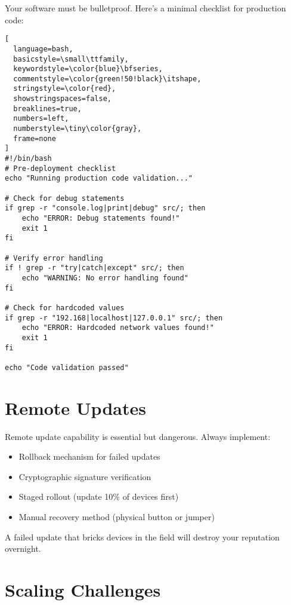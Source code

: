 Your software must be bulletproof. Here's a minimal checklist for production code:

\begin{tcolorbox}[colback=gray!5,colframe=gray!50,title=Production Validation Script]
\begin{lstlisting}[
  language=bash,
  basicstyle=\small\ttfamily,
  keywordstyle=\color{blue}\bfseries,
  commentstyle=\color{green!50!black}\itshape,
  stringstyle=\color{red},
  showstringspaces=false,
  breaklines=true,
  numbers=left,
  numberstyle=\tiny\color{gray},
  frame=none
]
#!/bin/bash
# Pre-deployment checklist
echo "Running production code validation..."

# Check for debug statements
if grep -r "console.log|print|debug" src/; then
    echo "ERROR: Debug statements found!"
    exit 1
fi

# Verify error handling
if ! grep -r "try|catch|except" src/; then
    echo "WARNING: No error handling found"
fi

# Check for hardcoded values
if grep -r "192.168|localhost|127.0.0.1" src/; then
    echo "ERROR: Hardcoded network values found!"
    exit 1
fi

echo "Code validation passed"
\end{lstlisting}
\end{tcolorbox}

\section{Remote Updates}

\begin{tcolorbox}[colback=yellow!10,colframe=orange!75!black,title=Caution: Remote Updates]
Remote update capability is essential but dangerous. Always implement:
\begin{itemize}
\item Rollback mechanism for failed updates
\item Cryptographic signature verification
\item Staged rollout (update 10\% of devices first)
\item Manual recovery method (physical button or jumper)
\end{itemize}

A failed update that bricks devices in the field will destroy your reputation overnight.
\end{tcolorbox}

\section{Scaling Challenges}

